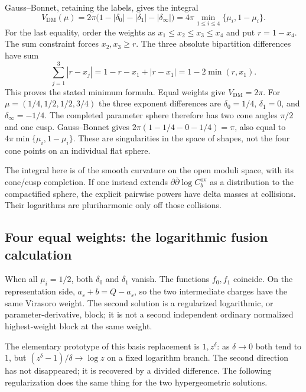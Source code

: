 Gauss--Bonnet, retaining the labels, gives the integral
\begin{equation}
 \boxed{\quad
 V_{\mathrm{DM}}(\mu)
 =2\pi\bigl(1-|\delta_0|-|\delta_1|-|\delta_\infty|\bigr)
 =4\pi\min_{1\le i\le4}\{\mu_i,1-\mu_i\}.
 \quad}
 \label{eq:general4DMvolume}
\end{equation}
For the last equality, order the weights as
$x_1\le x_2\le x_3\le x_4$ and put $r=1-x_4$.
The sum constraint forces $x_2,x_3\ge r$. The three absolute
bipartition differences have sum
\[
 \sum_{j=1}^3|r-x_j|
   =1-r-x_1+|r-x_1|=1-2\min(r,x_1).
\]
This proves the stated minimum formula. Equal weights give $V_{\mathrm{DM}}=2\pi$.
For $\mu=(1/4,1/2,1/2,3/4)$ the three exponent differences are
$\delta_0=1/4$, $\delta_1=0$, and $\delta_\infty=-1/4$.
The completed parameter sphere therefore has two cone angles
$\pi/2$ and one cusp. Gauss--Bonnet gives
$2\pi(1-1/4-0-1/4)=\pi$, also equal to
$4\pi\min\{\mu_i,1-\mu_i\}$. These are singularities in the
space of shapes, not the four cone points on an individual flat sphere.

The integral here is of the smooth curvature on the open
moduli space, with its cone/cusp completion. If one instead
extends $\partial\bar\partial\log C_b^{\mathrm{uv}}$ as a
distribution to the compactified sphere, the explicit
pairwise powers have delta masses at collisions. Their
logarithms are pluriharmonic only off those collisions.

\subsection{Four equal weights: the logarithmic fusion calculation}

When all $\mu_i=1/2$, both $\delta_0$ and $\delta_1$ vanish.
The functions $f_0,f_1$ coincide. On the representation side,
$a_s+b=Q-a_s$, so the two intermediate charges have the
same Virasoro weight. The second solution is a regularized
logarithmic, or parameter-derivative, block; it is not a
second independent ordinary normalized highest-weight block
at the same weight.

The elementary prototype of this basis replacement is
$1,z^\delta$: as $\delta\to0$ both tend to $1$, but
$(z^\delta-1)/\delta\to\log z$ on a fixed logarithm branch.
The second direction has not disappeared; it is recovered by a
divided difference. The following regularization does the same
thing for the two hypergeometric solutions.

